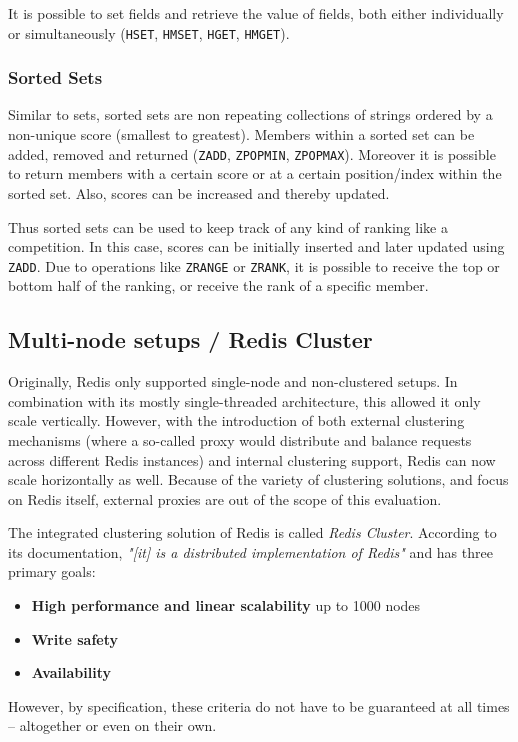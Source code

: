 It is possible to set fields and retrieve the value of fields, both either
individually or simultaneously (\texttt{HSET}, \texttt{HMSET}, \texttt{HGET},
\texttt{HMGET}). \parencite{redis:dataTypesIntroduction, redis:commands,
redis:dataTypes}

\subsubsection*{Sorted Sets}
Similar to sets, sorted sets are non repeating collections of strings ordered by
a non-unique score (smallest to greatest).  Members within a sorted set can be
added, removed and returned (\texttt{ZADD}, \texttt{ZPOPMIN}, \texttt{ZPOPMAX}).
Moreover it is possible to return members with a certain score or at a certain
position/index within the sorted set. Also, scores can be increased and thereby
updated.

Thus sorted sets can be used to keep track of any kind of ranking like a
competition. In this case, scores can be initially inserted and later updated using
\texttt{ZADD}.  Due to operations like \texttt{ZRANGE} or \texttt{ZRANK}, it is
possible to receive the top or bottom half of the ranking, or receive the rank
of a specific member. \parencite{redis:dataTypesIntroduction, redis:commands,
redis:dataTypes}

\subsection{Multi-node setups / Redis Cluster} \label{redis:multiNodeSetup}
Originally, Redis only supported single-node and non-clustered setups. In
combination with its mostly single-threaded architecture, this allowed it only
scale vertically.  However, with the introduction of both external clustering
mechanisms (where a so-called proxy would distribute and balance requests across
different Redis instances) and internal clustering support, Redis can now scale
horizontally as well. Because of the variety of clustering solutions, and focus
on Redis itself, external proxies are out of the scope of this evaluation.

The integrated clustering solution of Redis is called \textit{Redis Cluster}.
According to its documentation, \textit{"[it] is a distributed implementation
of Redis"} \parencite{redis:clusterSpecification} and has three primary goals:

\begin{itemize}
    \item \textbf{High performance and linear scalability} up to 1000 nodes
    \item \textbf{Write safety}
    \item \textbf{Availability}
\end{itemize}
However, by specification, these criteria do not have to be guaranteed at all
times -- altogether or even on their own. \parencite{redis:clusterSpecification}

